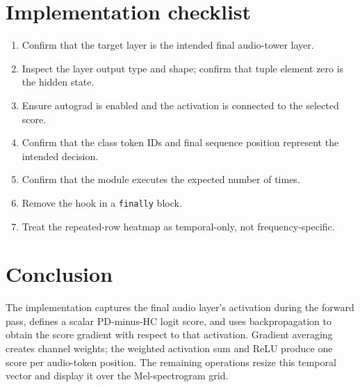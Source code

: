 \documentclass[11pt,a4paper]{article}
\begin{document}
\section{Implementation checklist}
\begin{enumerate}
\item Confirm that the target layer is the intended final audio-tower layer.
\item Inspect the layer output type and shape; confirm that tuple element zero is the hidden state.
\item Ensure autograd is enabled and the activation is connected to the selected score.
\item Confirm that the class token IDs and final sequence position represent the intended decision.
\item Confirm that the module executes the expected number of times.
\item Remove the hook in a \texttt{finally} block.
\item Treat the repeated-row heatmap as temporal-only, not frequency-specific.
\end{enumerate}

\section{Conclusion}
The implementation captures the final audio layer's activation during the forward pass, defines a scalar PD-minus-HC logit score, and uses backpropagation to obtain the score gradient with respect to that activation. Gradient averaging creates channel weights; the weighted activation sum and ReLU produce one score per audio-token position. The remaining operations resize this temporal vector and display it over the Mel-spectrogram grid.
\end{document}
